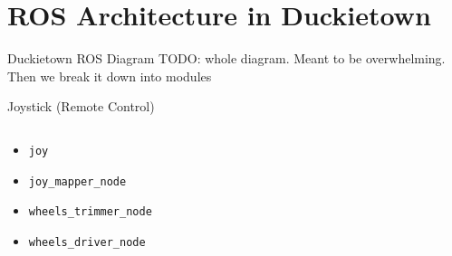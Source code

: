 \documentclass[aspectratio=43]{beamer}
\newcommand{\inline}[1]{\texttt{#1}}
\begin{document}

\section{ROS Architecture in Duckietown}

\begin{frame}{Duckietown ROS Diagram}
TODO: whole diagram. Meant to be overwhelming. Then we break it down into modules
\end{frame}


\begin{frame}{Joystick (Remote Control)}
	\begin{columns}
		\begin{column}{0.4\textwidth}
			\begin{itemize}
				\item \inline{joy}
				\item \inline{joy_mapper_node}
				\item \inline{wheels_trimmer_node}
				\item \inline{wheels_driver_node}
			\end{itemize}
		\end{column}
		\begin{column}{0.6\textwidth}
			\centering {}
		\end{column}
	\end{columns}
\end{frame}
\end{document}
